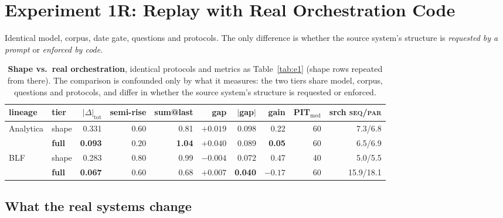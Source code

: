 \documentclass[10pt]{article}
\newcommand{\seq}{\textsc{seq}}
\newcommand{\pl}{\textsc{par}}
\begin{document}
\section{Experiment 1R: Replay with Real Orchestration Code}\label{sec:e1r}
Identical model, corpus, date gate, questions and protocols. The only difference is whether the
source system's structure is \emph{requested by a prompt} or \emph{enforced by code}.

\begin{table}[htbp]\centering\small
\begin{tabular}{@{}llrrrrrrrr@{}}
\toprule
lineage & tier & $|\Delta|_\text{tot}$ & semi-rise & sum@last & gap & $|$gap$|$ & gain &
PIT$_{\mathrm{med}}$ & srch \seq/\pl \\
\midrule
\multirow{2}{*}{Analytica} & shape & 0.331 & 0.60 & 0.81 & $+0.019$ & 0.098 & 0.22 & 60 & 7.3/6.8 \\
 & \textbf{full} & \textbf{0.093} & 0.20 & \textbf{1.04} & $+0.040$ & 0.089 & \textbf{0.05} & 60
 & 6.5/6.9 \\
\midrule
\multirow{2}{*}{BLF} & shape & 0.283 & 0.80 & 0.99 & $-0.004$ & 0.072 & 0.47 & 40 & 5.0/5.5 \\
 & \textbf{full} & \textbf{0.067} & 0.60 & 0.68 & $+0.007$ & \textbf{0.040} & $\mathbf{-0.17}$ &
 60 & 15.9/18.1 \\
\bottomrule
\end{tabular}
\caption{\textbf{Shape vs.\ real orchestration}, identical protocols and metrics as
Table~\ref{tab:e1} (shape rows repeated from there). The comparison is confounded only by what it
measures: the two tiers share model, corpus, questions and protocols, and differ in whether the
source system's structure is requested or enforced.}
\label{tab:e1r}
\end{table}

\subsection{What the real systems change}
\end{document}
